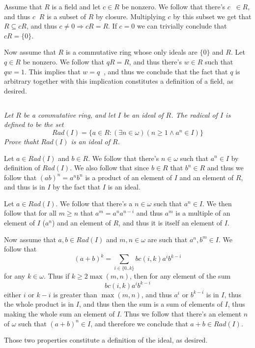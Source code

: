 \documentclass[11pt,oneside,titlepage]{book}
\DeclareMathOperator \inv {^{-1}}
\DeclareMathOperator \ra {\Rightarrow}
\newcommand{\set}[1]{\{ #1 \}}
\begin{document}
Assume that $R$ is a field and let $c \in R$ be nonzero. We follow
that there's $c\inv \in R$, and thus $c\inv R$ is a subset of $R$ by
closure. Multiplying $c$ by this subset we get that $R \subseteq cR$,
and thus $c \neq 0 \ra cR = R$.  If $c = 0$ we can trivially conclude
that $cR = \set{0}$.

Now assume that $R$ is a commutative ring whose only ideals are
$\set{0}$ and $R$. Let $q \in R$ be nonzero. We follow that $qR = R$,
and thus there's $w \in R$ such that $qw = 1$. This implies that $w =
q\inv$, and thus we conclude that the fact that $q$ is arbitrary
together with this implication constitutes a definition of a field, as
desired.

\subsection{}

\textit{Let $R$ be a commutative ring, and let $I$ be an ideal of
$R$. The radical of $I$ is defined to be the set
  $$Rad(I) = \set{a \in R: (\exists n \in \omega)(n \geq 1 \land a^n \in I)}$$
  Prove thaht $Rad(I)$ is an ideal of $R$.  }

Let $a \in Rad(I)$ and $b \in R$. We follow that there's $n \in
\omega$ such that $a^n \in I$ by definition of $Rad(I)$. We also
follow that since $b \in R$ that $b^n \in R$ and thus we follow that
$(ab)^n = a^n b^n$ is a product of an element of $I$ and an element of
$R$, and thus is in $I$ by the fact that $I$ is an ideal.


Let $a \in Rad(I)$. We follow that there's a $n \in \omega$ such that
$a^n \in I$. We then follow that for all $m \geq n$ that $a^m = a^n
a^{n - i}$ and thus $a^m$ is a multiple of an element of $I$ ($a^n$)
and an element of $R$, and thus it is itself an element of $I$.

Now assume that $a, b \in Rad(I)$ and $m, n \in \omega$ are such that
$a^n, b^m \in I$. We follow that
$$(a + b)^k = \sum_{i \in \set{0..k}}{bc(i, k)a^i b^{k - i}}$$
for any $k \in \omega$. Thus if $k \geq 2\max(m, n)$, then for any
element of the sum
$$bc(i, k)a^i b^{k - i}$$
either $i$ or $k - i$ is greater than $\max(m, n)$, and thus $a^i$ or
$b^{k - i}$ is in $I$, thus the whole product is in $I$, and thus then
the sum is a sum of elements of $I$, thus making the whole sum an
element of $I$. Thus we follow that there's an element $n$ of $\omega$
such that $(a + b)^n \in I$, and therefore we conclude that $a + b \in
Rad(I)$.

Those two properties constitute a definition of the ideal, as desired.
\end{document}

